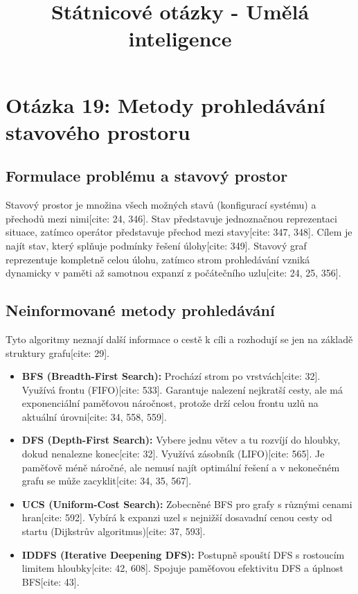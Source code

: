 \documentclass{article}
\title{Státnicové otázky - Umělá inteligence}
\begin{document}
\maketitle

\section{Otázka 19: Metody prohledávání stavového prostoru}

\subsection{Formulace problému a stavový prostor}
Stavový prostor je množina všech možných stavů (konfigurací systému) a přechodů mezi nimi[cite: 24, 346]. Stav představuje jednoznačnou reprezentaci situace, zatímco operátor představuje přechod mezi stavy[cite: 347, 348]. Cílem je najít stav, který splňuje podmínky řešení úlohy[cite: 349]. Stavový graf reprezentuje kompletně celou úlohu, zatímco strom prohledávání vzniká dynamicky v paměti až samotnou expanzí z počátečního uzlu[cite: 24, 25, 356].

\subsection{Neinformované metody prohledávání}
Tyto algoritmy neznají další informace o cestě k cíli a rozhodují se jen na základě struktury grafu[cite: 29].
\begin{itemize}
    \item \textbf{BFS (Breadth-First Search):} Prochází strom po vrstvách[cite: 32]. Využívá frontu (FIFO)[cite: 533]. Garantuje nalezení nejkratší cesty, ale má exponenciální paměťovou náročnost, protože drží celou frontu uzlů na aktuální úrovni[cite: 34, 558, 559].
    \item \textbf{DFS (Depth-First Search):} Vybere jednu větev a tu rozvíjí do hloubky, dokud nenalezne konec[cite: 32]. Využívá zásobník (LIFO)[cite: 565]. Je paměťově méně náročné, ale nemusí najít optimální řešení a v nekonečném grafu se může zacyklit[cite: 34, 35, 567].
    \item \textbf{UCS (Uniform-Cost Search):} Zobecněné BFS pro grafy s různými cenami hran[cite: 592]. Vybírá k expanzi uzel s nejnižší dosavadní cenou cesty od startu (Dijkstrův algoritmus)[cite: 37, 593].
    \item \textbf{IDDFS (Iterative Deepening DFS):} Postupně spouští DFS s rostoucím limitem hloubky[cite: 42, 608]. Spojuje paměťovou efektivitu DFS a úplnost BFS[cite: 43].
\end{itemize}
\end{document}
